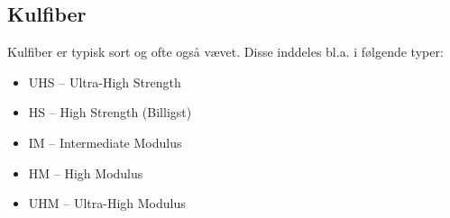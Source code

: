 \subsection{Kulfiber}
Kulfiber er typisk sort og ofte også vævet.
Disse inddeles bl.a. i følgende typer:
\begin{itemize}
  \item UHS -- Ultra-High Strength
  \item HS -- High Strength (Billigst)
  \item IM -- Intermediate Modulus
  \item HM -- High Modulus
  \item UHM -- Ultra-High Modulus
\end{itemize}
